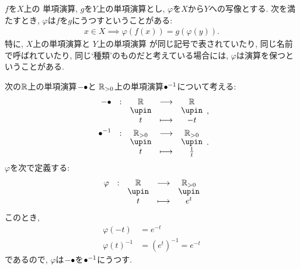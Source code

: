 \begin{definition}
  $f$を$X$上の
  単項演算,
  $g$を$Y$上の単項演算とし,
  $\varphi$を$X$から$Y$への写像とする.
  次を満たすとき, $\varphi$は$f$を$g$にうつすということがある:
  \begin{align*}
    x\in X \implies \varphi(f(x))=g(\varphi(y)).
  \end{align*}
  特に,
  $X$上の単項演算と
  $Y$上の単項演算
  が同じ記号で表されていたり,
  同じ名前で呼ばれていたり,
  同じ`種類'のものだと考えている場合には,
  $\varphi$は演算を保つということがある.
\end{definition}
\begin{example}
  次の$\mathbb{R}$上の単項演算$-{\bullet}$と
  $\mathbb{R}_{>0}$上の単項演算${\bullet}^{-1}$について考える: 
  \begin{align*}
    \shazo{-\tofu}{\RR}{\RR}
    {t}{-t},\\
    \shazo{\tofu^{-1}}{\RR_{>0}}{\RR_{>0}}
    {t}{\frac{1}{t}}.
  \end{align*}
  $\varphi$を次で定義する:
  \begin{align*}
    \shazo{\varphi}{\RR}{\RR_{>0}}
    {t}{e^t}
  \end{align*}
  このとき,
  \begin{align*}
    \varphi(-t)&=e^{-t}\\
    \varphi(t)^{-1}&=(e^{t})^{-1}=e^{-t}
  \end{align*}
  であるので, $\varphi$は$-{\bullet}$を${\bullet}^{-1}$にうつす.
\end{example}

